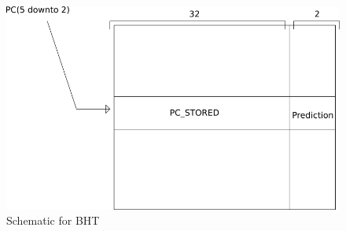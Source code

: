 \begin{figure}
	\centering
	\includegraphics[scale=0.5]{chapters/figures/bht}
	\caption{Schematic for BHT}
	\label{bht_fig}
\end{figure}